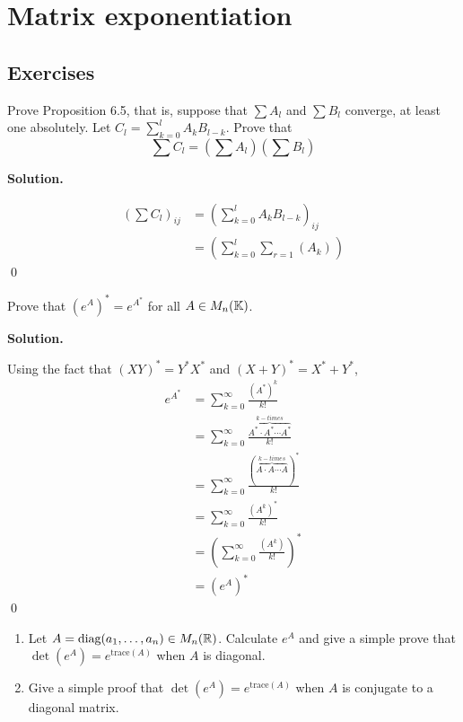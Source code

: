\documentclass[12pt]{book}
\theoremstyle{definition}
\newenvironment{solution}
{%
  \par\noindent\textbf{Solution.}\quad
}
{%
  \qed\par
}
\begin{document}
\chapter{Matrix exponentiation}
\section{Exercises}

\begin{taggedexercise}[WIP]
Prove Proposition 6.5, that is, suppose that $\sum A_l$ and $\sum B_l$ converge, at least one absolutely.
Let $C_l = \sum_{k=0}^l A_kB_{l-k}$. Prove that
\[
\sum C_l = (\sum A_l)(\sum B_l)
\]
\end{taggedexercise}

\begin{solution}
\[
\begin{aligned}
  (\sum C_l)_{ij} &= (\sum_{k=0}^l A_kB_{l-k})_{ij} \\
                  &= (\sum_{k=0}^l \sum_{r=1}(A_k)_{})
\end{aligned}
\]
\end{solution}

\begin{taggedexercise}[Complete]
  Prove that $(e^A)^* = e^{A^*}$ for all $A \in M_n(\mathbb{K})$.
\end{taggedexercise}

\begin{solution}
  Using the fact that $(XY)^* = Y^*X^*$ and $(X + Y)^* = X^* + Y^*$,
  \[
  \begin{aligned}
    e^{A^*} &= \sum_{k = 0}^\infty \frac{(A^*)^k}{k!} \\
            &= \sum_{k = 0}^\infty \frac{\overbrace{A^* \cdot A^* \cdots A^*}^{k-times}}{k!} \\
            &= \sum_{k = 0}^\infty \frac{(\overbrace{A \cdot A \cdots A}^{k-times})^*}{k!} \\
            &= \sum_{k = 0}^\infty \frac{(A^k)^*}{k!} \\
            &= \left(\sum_{k = 0}^\infty \frac{(A^k)}{k!}\right)^* \\
            &= (e^A)^*
  \end{aligned}
  \]
\end{solution}

\begin{taggedexercise}[Complete]
  \begin{enumerate}
    \item Let $A = \text{diag}(a_1, \dots, a_n) \in M_n(\mathbb{R})$. Calculate $e^A$ and give a simple prove that $\det(e^A) = e^{\text{trace}(A)}$ when $A$ is diagonal.
    \item Give a simple proof that $\det(e^A) = e^{\text{trace}(A)}$ when $A$ is conjugate to a diagonal matrix.
  \end{enumerate}
\end{taggedexercise}
\end{document}
